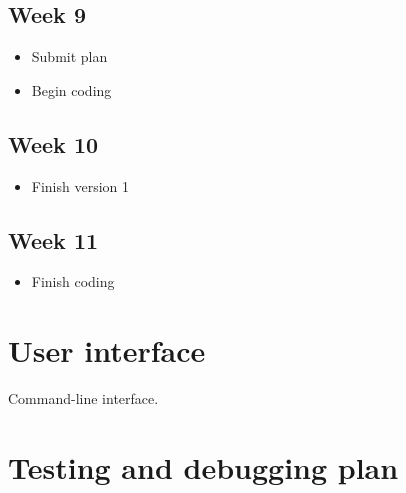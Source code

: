 \documentclass{article}
\begin{document}
  \subsection*{Week 9}
  \begin{itemize}
    \item Submit plan
    \item Begin coding
  \end{itemize}
  
  \subsection*{Week 10}
  \begin{itemize}
    \item Finish version 1
  \end{itemize}
  
  \subsection*{Week 11}
  \begin{itemize}
    \item Finish coding
  \end{itemize}
  
  \pagebreak
  
  \section{User interface}
  
  Command-line interface. 
  
  \lipsum[1]
  
  \section{Testing and debugging plan}
  
  \lipsum[1-2]
  
\end{document}
